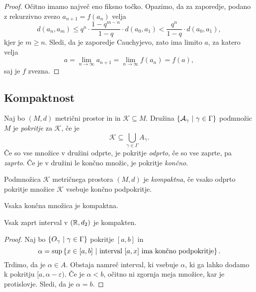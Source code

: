 \documentclass[12pt, a4paper]{article}
\begin{document}
\begin{proof}
Očitno imamo največ eno fiksno točko. Opazimo, da za zaporedje, podano z rekurzivno zvezo $a_{n+1}=f(a_n)$ velja
\[
d(a_n,a_m)\leq q^n\cdot\frac{1-q^{m-n}}{1-q}\cdot d(a_0,a_1)<\frac{q^n}{1-q}\cdot d(a_0,a_1),
\]
kjer je $m\geq n$. Sledi, da je zaporedje Cauchyjevo, zato ima limito $a$, za katero velja
\[
a=\lim_{n\to\infty}a_{n+1}=\lim_{n\to\infty}f(a_n)=f(a),
\]
saj je $f$ zvezna.
\end{proof}

\newpage

\subsection{Kompaktnost}

\begin{definicija}
Naj bo $(M,d)$ metrični prostor in in $\mathcal{K}\subseteq M$. Družina $\left\{\mathcal{A}_\gamma~\middle\vert~\gamma\in\Gamma\right\}$ podmnožic $M$ je \emph{pokritje} za $\mathcal{K}$, če je
\[
\mathcal{K}\subseteq\bigcup_{\gamma\in\Gamma}A_\gamma.
\]
Če so vse množice v družini odprte, je pokritje \emph{odprto}, če so vse zaprte, pa \emph{zaprto}. Če je v družini le končno množic, je pokritje \emph{končno}.
\end{definicija}

\begin{definicija}
Podmnožica $\mathcal{K}$ metričnega prostora $(M,d)$ je \emph{kompaktna}, če vsako odprto pokritje množice $\mathcal{K}$ vsebuje končno podpokritje.
\end{definicija}

\begin{opomba}
Vsaka končna množica je kompaktna.
\end{opomba}

\begin{trditev}
Vsak zaprt interval v $(\mathbb{R},d_2)$ je kompakten.
\end{trditev}

\begin{proof}
Naj bo $\left\{O_\gamma~\middle\vert~\gamma\in\Gamma\right\}$ pokritje $[a,b]$ in
\[
\alpha=\sup\left\{x\in[a,b]~\middle\vert~\text{interval $[a,x]$ ima končno podpokritje}\right\}.
\]
Trdimo, da je $\alpha\in A$. Obstaja namreč interval, ki vsebuje $\alpha$, ki ga lahko dodamo k pokritju $[a,\alpha-\varepsilon)$. Če je $\alpha<b$, očitno ni zgornja meja množice, kar je protislovje. Sledi, da je $\alpha=b$.
\end{proof}
\end{document}

